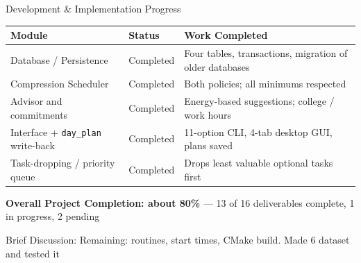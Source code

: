 \documentclass[aspectratio=169,11pt]{beamer}
\newcommand{\smallnote}[1]{%
\vspace{0.08cm}
{\scriptsize\color{GEUGrey}#1}
}
\begin{document}
\begin{frame}{Development \& Implementation Progress}

\scriptsize

\begin{center}

\renewcommand{\arraystretch}{1.25}

\begin{tabularx}{.96\textwidth}
{@{}p{3.2cm}p{1.9cm}X@{}}

\toprule
\textbf{Module} &
\textbf{Status} &
\textbf{Work Completed}\\
\midrule

Database / Persistence &
Completed &
Four tables, transactions, migration of older databases\\

Compression Scheduler &
Completed &
Both policies; all minimums respected\\

Advisor and commitments &
Completed &
Energy-based suggestions; college / work hours\\

Interface + \texttt{day\_plan} write-back &
Completed &
11-option CLI, 4-tab desktop GUI, plans saved\\

Task-dropping / priority queue &
Completed &
Drops least valuable optional tasks first\\

\bottomrule

\end{tabularx}

\end{center}

\vspace{3mm}

\begin{center}
\colorbox{GEULightBlue}{
\parbox{.78\textwidth}{
\centering
\textbf{Overall Project Completion: about 80\%} ---
13 of 16 deliverables complete, 1 in progress, 2 pending
}}
\end{center}

\vfill

\smallnote{
Brief Discussion: Remaining: routines, start times, CMake build. Made 6 dataset and tested it
}

\end{frame}
\end{document}
